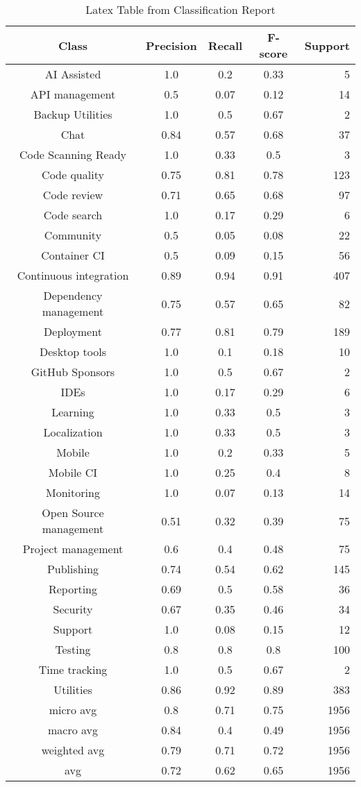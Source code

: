 \begin{table}
\caption{Latex Table from Classification Report}
\label{table:classification:report}
\centering
\begin{tabular}{c | c c c r}
Class & Precision & Recall & F-score & Support\\
\midrule
AI Assisted & 1.0 & 0.2 & 0.33 & 5\\
API management & 0.5 & 0.07 & 0.12 & 14\\
Backup Utilities & 1.0 & 0.5 & 0.67 & 2\\
Chat & 0.84 & 0.57 & 0.68 & 37\\
Code Scanning Ready & 1.0 & 0.33 & 0.5 & 3\\
Code quality & 0.75 & 0.81 & 0.78 & 123\\
Code review & 0.71 & 0.65 & 0.68 & 97\\
Code search & 1.0 & 0.17 & 0.29 & 6\\
Community & 0.5 & 0.05 & 0.08 & 22\\
Container CI & 0.5 & 0.09 & 0.15 & 56\\
Continuous integration & 0.89 & 0.94 & 0.91 & 407\\
Dependency management & 0.75 & 0.57 & 0.65 & 82\\
Deployment & 0.77 & 0.81 & 0.79 & 189\\
Desktop tools & 1.0 & 0.1 & 0.18 & 10\\
GitHub Sponsors & 1.0 & 0.5 & 0.67 & 2\\
IDEs & 1.0 & 0.17 & 0.29 & 6\\
Learning & 1.0 & 0.33 & 0.5 & 3\\
Localization & 1.0 & 0.33 & 0.5 & 3\\
Mobile & 1.0 & 0.2 & 0.33 & 5\\
Mobile CI & 1.0 & 0.25 & 0.4 & 8\\
Monitoring & 1.0 & 0.07 & 0.13 & 14\\
Open Source management & 0.51 & 0.32 & 0.39 & 75\\
Project management & 0.6 & 0.4 & 0.48 & 75\\
Publishing & 0.74 & 0.54 & 0.62 & 145\\
Reporting & 0.69 & 0.5 & 0.58 & 36\\
Security & 0.67 & 0.35 & 0.46 & 34\\
Support & 1.0 & 0.08 & 0.15 & 12\\
Testing & 0.8 & 0.8 & 0.8 & 100\\
Time tracking & 1.0 & 0.5 & 0.67 & 2\\
Utilities & 0.86 & 0.92 & 0.89 & 383\\
\midrule
micro avg & 0.8 & 0.71 & 0.75 & 1956\\
macro avg & 0.84 & 0.4 & 0.49 & 1956\\
weighted avg & 0.79 & 0.71 & 0.72 & 1956\\
avg & 0.72 & 0.62 & 0.65 & 1956\\
\end{tabular}
\end{table}